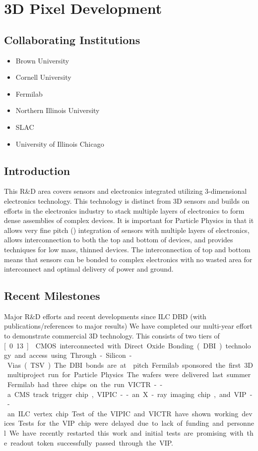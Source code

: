 \section{3D Pixel Development}
\subsection{Collaborating Institutions}
\begin{itemize}
\item Brown University
\item Cornell University
\item Fermilab
\item Northern Illinois University
\item SLAC
\item University of Illinois Chicago
\end{itemize}
\subsection{Introduction}
This R\&D area covers sensors and electronics integrated utilizing 3-dimensional electronics technology.  This technology is distinct from 3D sensors and builds on efforts in the electronics industry to stack multiple layers of electronics to form dense assemblies of complex devices.  It is important for Particle Physics in that it allows very fine pitch (\unit[4]{\micron}) integration of sensors with multiple layers of electronics, allows interconnection to both the top and bottom of devices, and provides techniques for low mass, thinned devices. The interconnection of top and bottom means that sensors can be bonded to complex electronics with no wasted area for interconnect and optimal delivery of power and ground.
\subsection{Recent Milestones}
Major R\&D efforts and recent developments since ILC DBD (with publications/references to major results)
We have completed our multi-year effort to demonstrate commercial 3D technology. This consists of two tiers of \unit[0.13]{\micron} CMOS interconnected with Direct Oxide Bonding (DBI) technology and access using Through-Silicon-Vias (TSV). The DBI bonds are at \unit[4]{\micron} pitch. Fermilab sponsored the first 3D multiproject run for Particle Physics. The wafers were delivered last summer. Fermilab had three chips on the run VICTR -- a CMS track trigger chip, VIPIC -- an X-ray imaging chip, and VIP -- an ILC vertex chip. Test of the VIPIC and VICTR have shown working devices.  Tests for the VIP chip were delayed due to lack of funding and personnel.  We have recently restarted this work and initial tests are promising with the readout token successfully passed through the VIP.

